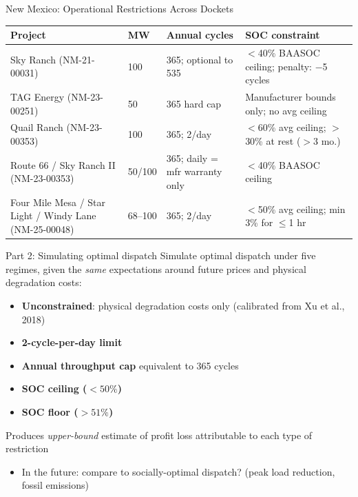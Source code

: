 \documentclass{beamer}
\begin{document}
\begin{frame}{New Mexico: Operational Restrictions Across Dockets}
\footnotesize
\begin{tabular}{p{3.5cm} p{0.8cm} p{1.9cm} p{3cm}}
\toprule
\textbf{Project} & \textbf{MW} & \textbf{Annual cycles} & \textbf{SOC constraint} \\
\midrule
Sky Ranch (NM-21-00031) & 100 & 365; optional to 535 & $<$40\% BAASOC ceiling; penalty: $-$5 cycles  \\
\addlinespace
TAG Energy (NM-23-00251) & 50 & 365 hard cap & Manufacturer bounds only; no avg ceiling  \\
\addlinespace
Quail Ranch (NM-23-00353) & 100 & 365; 2/day & $<$60\% avg ceiling; $>$30\% at rest ($>$3 mo.)  \\
\addlinespace
Route 66 / Sky Ranch II (NM-23-00353) & 50/100 & 365; daily = mfr warranty only & $<$40\% BAASOC ceiling  \\
\addlinespace
Four Mile Mesa / Star Light / Windy Lane (NM-25-00048) & 68--100 & 365; 2/day & $<$50\% avg ceiling; min 3\% for $\leq$1 hr \\
\bottomrule
\end{tabular}
\end{frame}

\begin{frame}{Part 2: Simulating optimal dispatch}
Simulate optimal dispatch under five regimes, given the \textit{same} expectations around future prices and physical degradation costs:
\vspace{0.2cm}
\begin{itemize}
    \item \textbf{Unconstrained}: physical degradation costs only (calibrated from Xu et al., 2018)
    \item \textbf{2-cycle-per-day limit}
    \item \textbf{Annual throughput cap} equivalent to 365 cycles
    \item \textbf{SOC ceiling ($<50\%$)}
    \item \textbf{SOC floor ($>51\%$)}
\end{itemize}

\vspace{0.3cm}
Produces \textit{upper-bound} estimate of profit loss attributable to each type of restriction

\begin{itemize}
    \item In the future: compare to socially-optimal dispatch? (peak load reduction, fossil emissions)
\end{itemize}

\end{frame}
\end{document}

